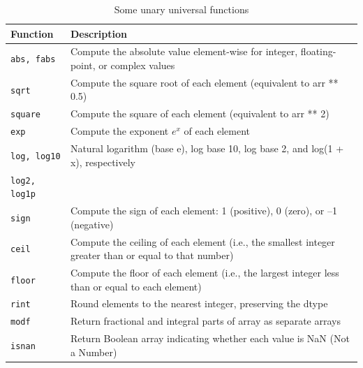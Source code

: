 \begin{table}
    \caption{Some unary universal functions}
    \label{Some unary universal functions}
    \begin{tabularx}{\textwidth}{lX}
        \hline
        Function               & Description                                                                                                 \\
        \hline
        \verb|abs, fabs|       & Compute the absolute value element-wise for integer, floating-point, or complex values                      \\
        \verb|sqrt|            & Compute the square root of each element (equivalent to arr ** 0.5)                                          \\
        \verb|square|          & Compute the square of each element (equivalent to arr ** 2)                                                 \\
        \verb|exp|             & Compute the exponent $e^x$ of each element                                                                  \\
        \verb|log, log10|      & Natural logarithm (base e), log base 10, log base 2, and log(1 + x), respectively                           \\
        \verb|log2, log1p|     &                                                                                                             \\
        \verb|sign|            & Compute the sign of each element: 1 (positive), 0 (zero), or –1 (negative)                                  \\
        \verb|ceil|            & Compute the ceiling of each element (i.e., the smallest integer greater than or equal to that number)       \\
        \verb|floor|           & Compute the floor of each element (i.e., the largest integer less than or equal to each element)            \\
        \verb|rint|            & Round elements to the nearest integer, preserving the dtype                                                 \\
        \verb|modf|            & Return fractional and integral parts of array as separate arrays                                            \\
        \verb|isnan|           & Return Boolean array indicating whether each value is NaN (Not a Number)                                    \\

\end{tabularx}
\end{table}
